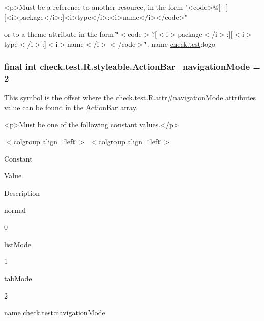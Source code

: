 \begin{DoxyVerb}      <p>Must be a reference to another resource, in the form "<code>@[+][<i>package</i>:]<i>type</i>:<i>name</i></code>"
\end{DoxyVerb}
 or to a theme attribute in the form \char`\"{}$<$code$>$?\mbox{[}$<$i$>$package$<$/i$>$\+:\mbox{]}\mbox{[}$<$i$>$type$<$/i$>$\+:\mbox{]}$<$i$>$name$<$/i$>$$<$/code$>$\char`\"{}.  name \hyperlink{namespacecheck_1_1test}{check.\+test}\+:logo \hypertarget{classcheck_1_1test_1_1_r_1_1styleable_a52cd104b62a9b6372ea39bd7da78cb1b}{}
\subsubsection[{Action\+Bar\+\_\+navigation\+Mode}]{\setlength{\rightskip}{0pt plus 5cm}final int check.\+test.\+R.\+styleable.\+Action\+Bar\+\_\+navigation\+Mode = 2\hspace{0.3cm}{\ttfamily [static]}}\label{classcheck_1_1test_1_1_r_1_1styleable_a52cd104b62a9b6372ea39bd7da78cb1b}
This symbol is the offset where the \hyperlink{classcheck_1_1test_1_1_r_1_1attr_a6d552efd1c8cd8a467d4a5441179e7bc}{check.\+test.\+R.\+attr\#navigation\+Mode} attribute\textquotesingle{}s value can be found in the \hyperlink{classcheck_1_1test_1_1_r_1_1styleable_ad0a4d403cb244ea4d22c6f6ebf2c2cdf}{Action\+Bar} array.

\begin{DoxyVerb}      <p>Must be one of the following constant values.</p>
\end{DoxyVerb}
 \begin{TabularC}{0}
\hline
\end{TabularC}
$<$colgroup align=\char`\"{}left\char`\"{}$>$ $<$colgroup align=\char`\"{}left\char`\"{}$>$ 

Constant

Value

Description 

{\ttfamily normal}

0

{\ttfamily list\+Mode}

1

{\ttfamily tab\+Mode}

2

name \hyperlink{namespacecheck_1_1test}{check.\+test}\+:navigation\+Mode \hypertarget{classcheck_1_1test_1_1_r_1_1styleable_a50824fb411f147909363103d29b2ac25}{}

